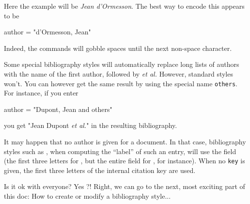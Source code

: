 
Here the example will be \emph{Jean d'Ormesson}. 
The best way to encode this appears to be
\begin{verbatimtab}
  author = "d'\relax Ormesson, Jean"
\end{verbatimtab}
Indeed, the  commands will gobble spaces until the next
non-space character. 


Some special bibliography styles will automatically replace long lists of 
authors with the name of the first author, followed by \emph{et al.} 
However, standard \bt styles won't. You can however get the same result by 
using the special name \verb+others+. For instance, if you enter
\begin{verbatimtab}
  author = "Dupont, Jean and others"
\end{verbatimtab}
you get "Jean Dupont \emph{et al.}" in the resulting bibliography.


It may happen that no author is given for a document. In that case, 
bibliography styles such as , when computing the ``label'' of such
an entry, will use the  field (the first three letters for
, but the entire field for , for instance). 
When no \texttt{key} is given, the first three letters of the internal
citation key are used.

\bigskip

Is it ok with everyone? Yes ?!
Right, we can go to the next, most exciting part of
this doc: How to create or modify a bibliography style...


